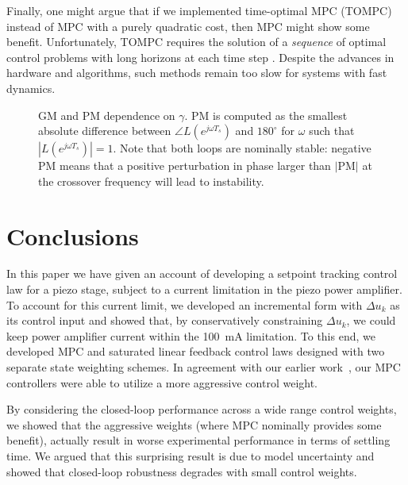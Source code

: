 \documentclass[twocolumn,twoside]{IEEEtran}
\begin{document}
Finally, one might argue that if we implemented time-optimal MPC (TOMPC) \cite{broeck_time_2009} instead of MPC with a purely quadratic cost, then MPC might show some benefit. Unfortunately, TOMPC requires the solution of a \emph{sequence} of optimal control problems with long horizons at each time step \cite{broeck_time_2009}. Despite the advances in hardware and algorithms, such methods remain too slow for systems with fast dynamics. 

\begin{figure}[ht!]
  
  \caption{GM and PM dependence on $\gamma$. PM is computed as the smallest absolute difference between $\angle L(e^{j\omega T_s})$ and $180^{\circ}$ for $\omega$ such that $|L(e^{j\omega T_s})|=1$. Note that both loops are nominally stable: negative PM means that a positive perturbation in phase larger than $|$PM$|$ at the crossover frequency will lead to instability.}
  \label{fig:gmpm}
\end{figure}

\section{Conclusions}
In this paper we have given an account of developing a setpoint tracking control law for a piezo stage, subject to a current limitation in the piezo power amplifier. To account for this current limit, we developed an incremental form with $\Delta u_k$ as its control input and showed that, by conservatively constraining $\Delta u_k$, we could keep power amplifier current within the 100~mA limitation. To this end, we developed MPC and saturated linear feedback control laws designed with two separate state weighting schemes. In agreement with our earlier work~\cite{braker_application_2017}, our MPC controllers were able to utilize a more aggressive control weight.

By considering the closed-loop performance across a wide range control weights, we showed that the aggressive weights (where MPC nominally provides some benefit), actually result in worse experimental performance in terms of settling time. We argued that this surprising result is due to model uncertainty and showed that closed-loop robustness degrades with small control weights. 
\end{document}
